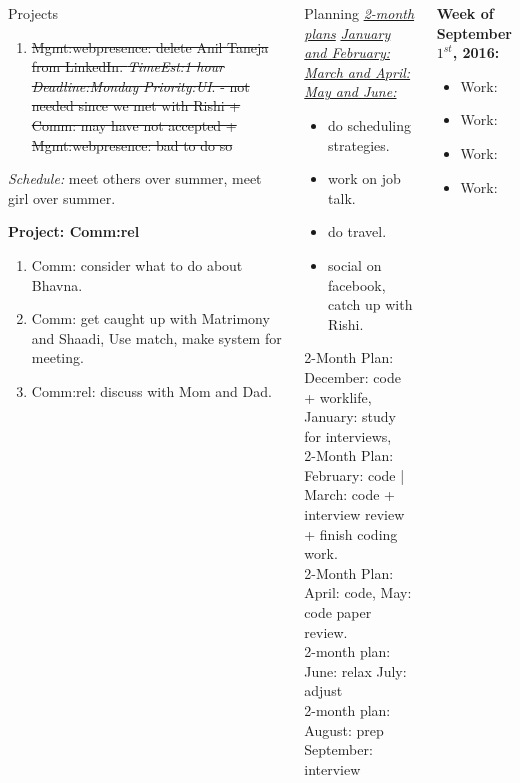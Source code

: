 \documentclass[serif, mathserif, final]{beamer}
\newcommand{\doneTask}[1]{\tiny \item \tiny \sout{#1}}
\newcommand{\te}[1]{\textit{TimeEst:}\textit{#1}}
\newcommand{\dl}[1]{\textit{Deadline:}\textit{#1}}
\newcommand{\pr}[1]{\textit{Priority:}\textit{#1}}
\begin{document}
\begin{frame}
\begin{columns}
\begin{block}{Projects}
\begin{enumerate}
      \doneTask{Mgmt:webpresence: delete Anil Taneja from
        LinkedIn. \te{1 hour} \dl{Monday} \pr{UI}. - not needed since
        we met with Rishi  + Comm: may have not accepted +
        Mgmt:webpresence: bad to do so}


\end{enumerate}
{\it Schedule:} meet others over summer, meet girl over summer.

{\bf Project: Comm:rel} 
\begin{enumerate} 

      \item \tiny Comm: consider what to do about Bhavna.
\tiny \item \tiny Comm: get caught up with Matrimony and Shaadi, Use match, make system
  for meeting. 
\item \tiny Comm:rel: discuss with Mom and Dad. 
\end{enumerate} 
\end{block} 

\begin{block}{Planning} 
\underline{\textit{2-month plans}}
\underline{\textit{January and February:}}
\underline{\textit{March and April:}} 
\underline{\textit{May and June:}}
\begin{itemize}
\tiny \item \tiny do scheduling strategies. 
\item \tiny work on job talk. 
\item \tiny do travel. 
\item \tiny social on facebook, catch up with Rishi. 
\end{itemize} 

2-Month Plan: December: code + worklife, January: study for interviews,  \\
2-Month Plan: February: code | March:  code + interview review + finish coding work.    \\ 
2-Month Plan: April: code, May: code paper review. \\
2-month plan: June: relax July: adjust \\ 
2-month plan: August:  prep September: interview \\
\end{block} 


\begin{block}
\textbf{Week of September $1^{st}$, 2016:} \\
\begin{itemize} 
\tiny \item \tiny Work: 
\item \tiny Work:
\item \tiny Work:
\item \tiny Work:
\end{itemize}


\end{block}
\end{columns}
\end{frame}
\end{document}
